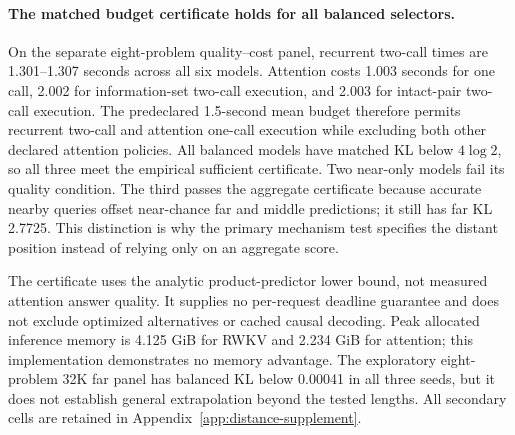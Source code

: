 \paragraph{The matched budget certificate holds for all balanced selectors.}
On the separate eight-problem quality--cost panel, recurrent two-call times
are 1.301--1.307 seconds across all six models. Attention costs 1.003 seconds
for one call, 2.002 for information-set two-call execution, and 2.003 for
intact-pair two-call execution. The predeclared 1.5-second mean budget therefore
permits recurrent two-call and attention one-call execution while excluding
both other declared attention policies. All balanced models have matched KL
below $4\log2$, so all three meet the empirical sufficient certificate.
Two near-only models fail its quality condition. The third passes the
aggregate certificate because accurate nearby queries offset near-chance
far and middle predictions; it still has far KL 2.7725. This distinction is why
the primary mechanism test specifies the distant position instead of relying
only on an aggregate score.

\begin{table}[t]
\centering\small
\caption{All fixed adaptations. The 16K KL and equal-call gain average 32
problems and three positions. Equal-call gain is intact-pair minus
information-set KL; its dependence-only prediction is $4\log2$.
Matched KL, latency, and certificate use the separate eight-problem,
three-position panel and the 1.5-second mean budget. All KL values are nats.}
\resizebox{\linewidth}{!}{}
\label{tab:distance-cost}
\end{table}

The certificate uses the analytic product-predictor lower bound, not measured
attention answer quality. It supplies no per-request deadline guarantee and
does not exclude optimized alternatives or cached causal decoding.
Peak allocated inference memory is 4.125 GiB for RWKV and 2.234 GiB for attention;
this implementation demonstrates no memory advantage.
The exploratory eight-problem 32K far panel has balanced KL below 0.00041
in all three seeds, but it does not establish general extrapolation beyond
the tested lengths. All secondary cells are retained in
Appendix~\ref{app:distance-supplement}.
